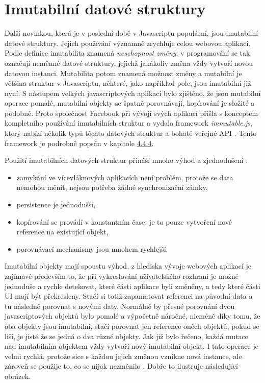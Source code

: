 \section{Imutabilní datové struktury}
\label{sec:immutability}
Další novinkou, která je v poslední době v Javascriptu populární, jsou imutabilní datové struktury. Jejich používání významně zrychluje celou webovou aplikaci. Podle definice imutabilita znamená \textit{neschopnost změny}, v programování se tak označují neměnné datové struktury, jejichž jakákoliv změna vždy vytvoří novou datovou instanci. Mutabilita potom znamená možnost změny a mutabilní je většina struktur v Javascriptu, některé, jako například pole, jsou imutabilní již nyní. S nástupem velkých javascriptových aplikací bylo zjištěno, že jsou mutabilní operace pomalé, mutabilní objekty se špatně porovnávají, kopírování je složité a podobně. Proto společnost Facebook při vývojí svých aplikací přišla s konceptem kompletního používání imutabilních struktur a vydala framework \textit{immutable.js}, který nabízí několik typů těchto datových struktur a bohaté veřejné API \cite{immutablejs_learn} \cite{immutablejs}. Tento framework je podrobně popsán v kapitole \hyperref[sec:immutable_js]{4.4.4}.

\vspace{3mm}
\noindent Použití imutabilních datových struktur přináší mnoho výhod a zjednodušení \cite{immutablejs_learn}:
\begin{itemize}
\item zamykání ve vícevláknových aplikacích není problém, protože se data nemohou měnit, nejsou potřeba žádné synchronizační zámky,
\item persistence je jednodušší,
\item kopírování se provádí v konstantním čase, je to pouze vytvoření nové reference na existující objekt,
\item porovnávací mechanismy jsou mnohem rychlejší.
\end{itemize}

Imutabilní objekty mají spoustu výhod, z hlediska vývoje webových aplikací je zajímavé především to, že při vykreslování uživatelského rozhraní je možné jednoduše a rychle detekovat, které části aplikace byli změněny, a tedy které části UI mají být překresleny. Stačí si totiž zapamatovat referenci na původní data a tu následně porovnat s novými daty. Normálně by přesné porovnání dvou javascriptových objektů bylo pomalé a výpočetně náročné, nicméně díky tomu, že oba objekty jsou imutabilní, stačí porovnat jen reference oněch objektů, pokud se liší, je jisté že se jedná o dva různé objekty. Jak již bylo řečeno, každá mutace nad imutabilním objektem vždy vytvoří nový imutabilní objekt. I tato operace je velmi rychlá, protože sice s každou jejich změnou vznikne nová instance, ale zároveň se použije to, co se nijak nezměnilo \cite{immutablejs_learn}. Dobře to ilustruje následující obrázek.

